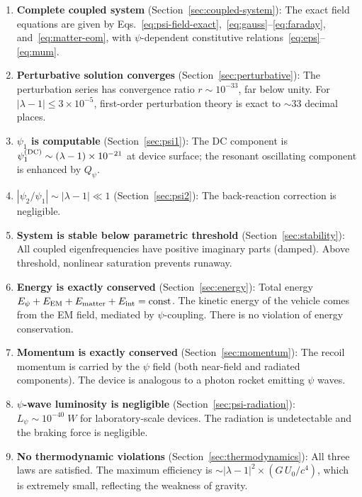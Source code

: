 \documentclass[aps,prd,twocolumn,superscriptaddress,floatfix,nofootinbib]{revtex4-2}
\newcommand{\lam}{\lambda}
\begin{document}
\begin{enumerate}
\item \textbf{Complete coupled system} (Section~\ref{sec:coupled-system}):
The exact field equations are given by
Eqs.~\eqref{eq:psi-field-exact},~\eqref{eq:gauss}--\eqref{eq:faraday},
and~\eqref{eq:matter-eom}, with $\psi$-dependent constitutive
relations~\eqref{eq:eps}--\eqref{eq:mum}.

\item \textbf{Perturbative solution converges}
(Section~\ref{sec:perturbative}): The perturbation series has
convergence ratio $r \sim 10^{-33}$, far below unity. For
$|\lam-1| \leq 3\times10^{-5}$, first-order perturbation theory is
exact to $\sim 33$ decimal places.

\item \textbf{$\psi_1$ is computable}
(Section~\ref{sec:psi1}): The DC component is
$\psi_1^{(\rm DC)} \sim (\lam-1) \times 10^{-21}$ at device
surface; the resonant oscillating component is enhanced by $Q_\psi$.

\item \textbf{$|\psi_2/\psi_1| \sim |\lam-1| \ll 1$}
(Section~\ref{sec:psi2}): The back-reaction correction is negligible.

\item \textbf{System is stable below parametric threshold}
(Section~\ref{sec:stability}): All coupled eigenfrequencies have
positive imaginary parts (damped). Above threshold, nonlinear saturation
prevents runaway.

\item \textbf{Energy is exactly conserved}
(Section~\ref{sec:energy}): Total energy
$E_\psi + E_{\rm EM} + E_{\rm matter} + E_{\rm int} = {\rm const}$.
The kinetic energy of the vehicle comes from the EM field, mediated
by $\psi$-coupling. There is no violation of energy conservation.

\item \textbf{Momentum is exactly conserved}
(Section~\ref{sec:momentum}): The recoil momentum is carried by the
$\psi$ field (both near-field and radiated components). The device is
analogous to a photon rocket emitting $\psi$ waves.

\item \textbf{$\psi$-wave luminosity is negligible}
(Section~\ref{sec:psi-radiation}): $L_\psi \sim 10^{-40}\;\si{W}$
for laboratory-scale devices. The radiation is undetectable and the
braking force is negligible.

\item \textbf{No thermodynamic violations}
(Section~\ref{sec:thermodynamics}): All three laws are satisfied.
The maximum efficiency is $\sim |\lam-1|^2 \times (G\,U_0/c^4)$,
which is extremely small, reflecting the weakness of gravity.
\end{enumerate}
\end{document}
